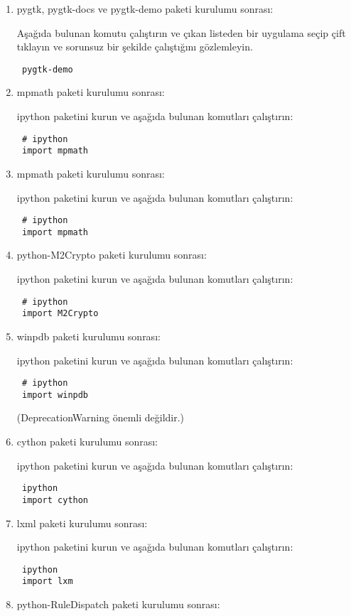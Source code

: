 \documentclass[a4paper,10pt]{article}
\begin{document}
\begin{enumerate}
\item pygtk, pygtk-docs ve pygtk-demo paketi kurulumu sonrası: 

Aşağıda bulunan komutu çalıştırın ve çıkan listeden bir uygulama seçip çift tıklayın ve sorunsuz bir şekilde çalıştığını gözlemleyin.
\begin{verbatim}
 pygtk-demo
\end{verbatim}


\item mpmath paketi kurulumu sonrası:  

ipython paketini kurun ve aşağıda bulunan komutları çalıştırın:
\begin{verbatim}
 # ipython
 import mpmath
\end{verbatim}

\item mpmath paketi kurulumu sonrası:  

ipython paketini kurun ve aşağıda bulunan komutları çalıştırın:
\begin{verbatim}
 # ipython
 import mpmath
\end{verbatim}

\item python-M2Crypto paketi kurulumu sonrası:

ipython paketini kurun ve aşağıda bulunan komutları çalıştırın:
\begin{verbatim}
 # ipython
 import M2Crypto
\end{verbatim}

\item winpdb paketi kurulumu sonrası:

ipython paketini kurun ve aşağıda bulunan komutları çalıştırın:
\begin{verbatim}
 # ipython
 import winpdb
\end{verbatim}
(DeprecationWarning önemli değildir.)

\item cython paketi kurulumu sonrası:

ipython paketini kurun ve aşağıda bulunan komutları çalıştırın:
\begin{verbatim}
 ipython
 import cython
\end{verbatim}

\item lxml paketi kurulumu sonrası:  

ipython paketini kurun ve aşağıda bulunan komutları çalıştırın:
\begin{verbatim}
 ipython
 import lxm
\end{verbatim}
\item python-RuleDispatch paketi kurulumu sonrası:  


\end{enumerate}
\end{document}
